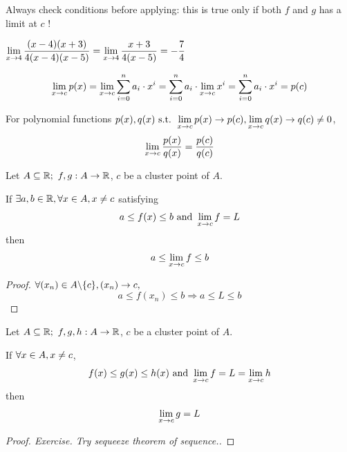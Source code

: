 \documentclass[a4paper,12pt]{article}
\begin{document}
\begin{remark}
    Always check conditions before applying: this is true only if both \(f\) and \(g\) has a limit at \(c\) !
\end{remark}

\newpage
\begin{example}
    \(\displaystyle\lim_{x\rightarrow 4} {\frac{(x-4)(x+3)}{4(x-4)(x-5)}}=\lim_{x\rightarrow 4} {\frac{x+3}{4(x-5)}}=-\frac{7}{4}\)\\
\end{example}

\begin{corollary}
    \[\lim_{x\rightarrow c } {p(x)}=\lim_{x\rightarrow c } {\sum_{i=0}^{n}a_i\cdot x^i}=\sum_{i=0}^{n}a_i\cdot\lim_{x\rightarrow c } {x^i}=\sum_{i=0}^{n}a_i\cdot x^i=p(c)\]
\end{corollary}

\begin{corollary}
    For polynomial functions \(\displaystyle p(x),q(x)\text{ s.t. } \\\lim_{x\rightarrow c} {p(x)}\rightarrow p(c), \lim_{x\rightarrow c} {q(x)}\rightarrow q(c)\neq 0\),
    \[\lim_{x\rightarrow c } {\frac{p(x )}{q(x )}}=\frac{p(c )}{q(c )}\]
\end{corollary}

\begin{theorem}
    Let \(A\subseteq\R;\ f,g:A\rightarrow\R\), \(c \) be a cluster point of \(A\). 
    
    If \(\exists a,b\in\mathbb{R}, \forall x\in A, x\neq c\) satisfying 
    \[a\le f(x)\le b\text{ and }\lim_{x\rightarrow c} {f}=L\]
    then \[a\le\lim_{x\rightarrow c} {f}\le b\]
    \begin{proof}
        \(\displaystyle \forall (x _{n })\in A\backslash\{c\}, (x _{n })\rightarrow c,\)
        \[a\le f(x_n)\le b\Rightarrow a\le L \le b\]
    \end{proof}
\end{theorem}

\begin{theorem}
    Let \(A\subseteq\R;\ f,g,h:A\rightarrow\R\), \(c \) be a cluster point of \(A\). 

    If \(\displaystyle\forall x\in A, x\neq c\), \[f(x)\le g(x) \le h(x)\text{ and }\lim_{x\rightarrow c} {f}=L=\lim_{x\rightarrow c} {h}\]
    then 
    \[\lim_{x\rightarrow c } {g}=L\]
    \begin{proof}[Proof. Exercise. Try sequeeze theorem of sequence.]
    \end{proof}
\end{theorem}
\end{document}
